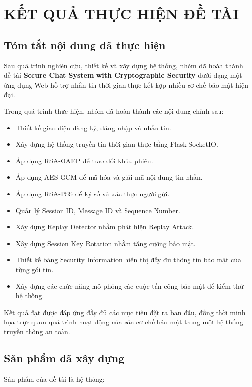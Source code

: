 \chapter{KẾT QUẢ THỰC HIỆN ĐỀ TÀI}

\section{Tóm tắt nội dung đã thực hiện}

Sau quá trình nghiên cứu, thiết kế và xây dựng hệ thống, nhóm đã hoàn thành đề tài \textbf{Secure Chat System with Cryptographic Security} dưới dạng một ứng dụng Web hỗ trợ nhắn tin thời gian thực kết hợp nhiều cơ chế bảo mật hiện đại.

Trong quá trình thực hiện, nhóm đã hoàn thành các nội dung chính sau:

\begin{itemize}
    \item Thiết kế giao diện đăng ký, đăng nhập và nhắn tin.
    \item Xây dựng hệ thống truyền tin thời gian thực bằng Flask-SocketIO.
    \item Áp dụng RSA-OAEP để trao đổi khóa phiên.
    \item Áp dụng AES-GCM để mã hóa và giải mã nội dung tin nhắn.
    \item Áp dụng RSA-PSS để ký số và xác thực người gửi.
    \item Quản lý Session ID, Message ID và Sequence Number.
    \item Xây dựng Replay Detector nhằm phát hiện Replay Attack.
    \item Xây dựng Session Key Rotation nhằm tăng cường bảo mật.
    \item Thiết kế bảng Security Information hiển thị đầy đủ thông tin bảo mật của từng gói tin.
    \item Xây dựng các chức năng mô phỏng các cuộc tấn công bảo mật để kiểm thử hệ thống.
\end{itemize}

Kết quả đạt được đáp ứng đầy đủ các mục tiêu đặt ra ban đầu, đồng thời minh họa trực quan quá trình hoạt động của các cơ chế bảo mật trong một hệ thống truyền thông an toàn.

\section{Sản phẩm đã xây dựng}

Sản phẩm của đề tài là hệ thống:

